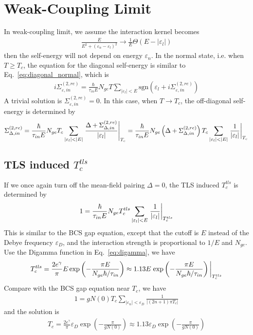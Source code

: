 \documentclass[]{article}
\begin{document}
\section{Weak-Coupling Limit}
In weak-coupling limit, we assume the interaction kernel becomes
\begin{align}
    \frac{E}{E^2+(\varepsilon_n-\varepsilon_l)^2} \rightarrow
    \frac{1}{E}\Theta(E-|\varepsilon_l|)
\end{align}
then the self-energy will not depend on energy $\varepsilon_n$.
In the normal state, i.e. when $T \geq T_c$,
the equation for the diagonal self-energy is similar to
Eq.~\eqref{eq:diagonal_normal}, which is
\begin{align}
    i\Sigma_{\varepsilon,in}^{(2,re)} = \frac{\hbar}{\tau_{in}E}N_{ge}T
    \sum_{|\varepsilon_l| < E}
    \text{sgn}\left(\varepsilon_l + i\Sigma_{\varepsilon,in}^{(2,re)}\right)
\end{align}
A trivial solution is $\Sigma_{\varepsilon,in}^{(2,re)} = 0$. In this case,
when $T \rightarrow T_c$, the off-diagonal self-energy is determined by
\begin{align}\label{eq:off-diagonal_weak}
    \Sigma_{\Delta,in}^{(2,re)} = \frac{\hbar}{\tau_{in}E}N_{ge}T_c\sum_{|\varepsilon_l| < |E|}
    \eval{\frac{\Delta + \Sigma_{\Delta,in}^{(2,re)}}{|\varepsilon_l|}}_{T_c}
    = \frac{\hbar}{\tau_{in}E}N_{ge}\left(\Delta + \Sigma_{\Delta,in}^{(2,re)}\right)
    T_c\sum_{|\varepsilon_l| < |E|}\eval{\frac{1}{|\varepsilon_l|}}_{T_c}
\end{align}
\subsection{TLS induced $T_c^{tls}$}
If we once again turn off the mean-field pairing $\Delta = 0$,
the TLS induced $T_c^{tls}$ is determined by
\begin{align}
    1 = \frac{\hbar}{\tau_{in}E}N_{ge}T_c^{tls}\sum_{|\varepsilon_l| < E}
    \eval{\frac{1}{|\varepsilon_l|}}_{T_c^{tls}}
\end{align}
This is similar to the BCS gap equation, except that the cutoff is $E$ instead of
the Debye frequency $\varepsilon_D$, and the interaction strength is proportional to
$1/E$ and $N_{ge}$. Use the Digamma function in Eq.~\eqref{eq:digamma}, we have
\begin{align}
    T_c^{tls} = \frac{2e^\gamma}{\pi}E\exp\left(-\frac{\pi E}{N_{ge}\hbar/\tau_{in}}\right)
    \approx 1.13E\eval{\exp\left(-\frac{\pi E}{N_{ge}\hbar/\tau_{in}}\right)}_{T_c^{tls}}
\end{align}
Compare with the BCS gap equation near $T_c$, we have
\begin{align}
    1 = gN(0)T_c\sum_{|\varepsilon_n| < \varepsilon_D}\frac{1}{|(2n+1)\pi T_c|}
\end{align}
and the solution is
\begin{align}
    T_c = \frac{2e^\gamma}{\pi}\varepsilon_D\exp\left(-\frac{\pi}{gN(0)}\right)
    \approx 1.13\varepsilon_D\exp\left(-\frac{\pi}{gN(0)}\right)
\end{align}
\end{document}
